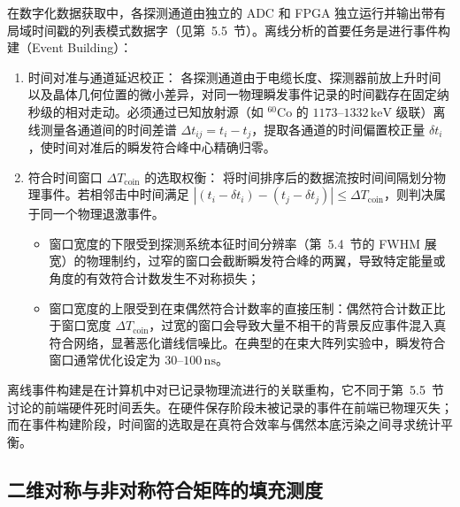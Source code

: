 在数字化数据获取中，各探测通道由独立的 ADC 和 FPGA 独立运行并输出带有局域时间戳的列表模式数据字（见第~5.5~节）。离线分析的首要任务是进行事件构建（Event Building）：
\begin{enumerate}
\item 时间对准与通道延迟校正：
各探测通道由于电缆长度、探测器前放上升时间以及晶体几何位置的微小差异，对同一物理瞬发事件记录的时间戳存在固定纳秒级的相对走动。必须通过已知放射源（如 $^{60}\mathrm{Co}$ 的 $1173\text{--}1332\,\text{keV}$ 级联）离线测量各通道间的时间差谱 $\Delta t_{ij} = t_i - t_j$，提取各通道的时间偏置校正量 $\delta t_i$，使时间对准后的瞬发符合峰中心精确归零。
\item 符合时间窗口 $\Delta T_{\mathrm{coin}}$ 的选取权衡：
将时间排序后的数据流按时间间隔划分物理事件。若相邻击中时间满足 $|(t_i - \delta t_i) - (t_j - \delta t_j)| \le \Delta T_{\mathrm{coin}}$，则判决属于同一个物理退激事件。
\begin{itemize}
\item 窗口宽度的下限受到探测系统本征时间分辨率（第~5.4~节的 FWHM 展宽）的物理制约，过窄的窗口会截断瞬发符合峰的两翼，导致特定能量或角度的有效符合计数发生不对称损失；
\item 窗口宽度的上限受到在束偶然符合计数率的直接压制：偶然符合计数正比于窗口宽度 $\Delta T_{\mathrm{coin}}$，过宽的窗口会导致大量不相干的背景反应事件混入真符合网络，显著恶化谱线信噪比。在典型的在束大阵列实验中，瞬发符合窗口通常优化设定为 $30\text{--}100\,\text{ns}$。
\end{itemize}
\end{enumerate}
离线事件构建是在计算机中对已记录物理流进行的关联重构，它不同于第~5.5~节讨论的前端硬件死时间丢失。在硬件保存阶段未被记录的事件在前端已物理灭失；而在事件构建阶段，时间窗的选取是在真符合效率与偶然本底污染之间寻求统计平衡。

\subsection{二维对称与非对称符合矩阵的填充测度}\label{subsec:5-6-2}


